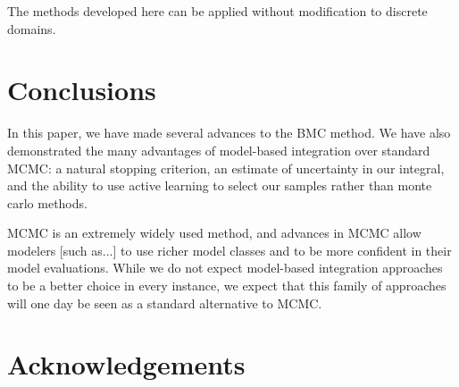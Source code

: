 \documentclass{article}
\begin{document}
The methods developed here can be applied without modification to discrete domains.

\section{Conclusions}

 In this paper, we have made several advances to the BMC method.  We have also demonstrated the many advantages of model-based integration over standard MCMC: a natural stopping criterion, an estimate of uncertainty in our integral, and the ability to use active learning to select our samples rather than monte carlo methods.

MCMC is an extremely widely used method, and advances in MCMC allow modelers [such as...] to use richer model classes and to be more confident in their model evaluations.  While we do not expect model-based integration approaches to be a better choice in every instance, we expect that this family of approaches will one day be seen as a standard alternative to MCMC.

\section*{Acknowledgements}



\end{document}
